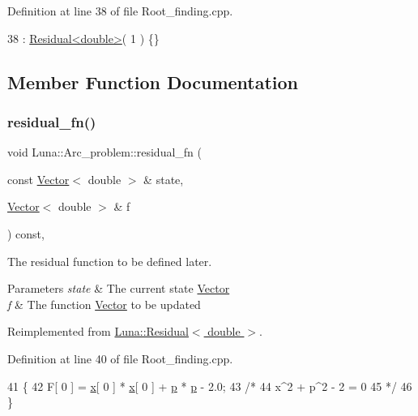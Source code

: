 Definition at line 38 of file Root\+\_\+finding.\+cpp.


\begin{DoxyCode}
38 : \hyperlink{classLuna_1_1Residual}{Residual<double>}( 1 ) \{\}
\end{DoxyCode}


\subsection{Member Function Documentation}
\mbox{\label{classLuna_1_1Arc__problem_aeb5e14b8b06d0ad0f8b42cb280836f97}} 
\subsubsection{\texorpdfstring{residual\+\_\+fn()}{residual\_fn()}}
{\footnotesize\ttfamily void Luna\+::\+Arc\+\_\+problem\+::residual\+\_\+fn (\begin{DoxyParamCaption}\item[{const \hyperlink{classLuna_1_1Vector}{Vector}$<$ double $>$ \&}]{state,  }\item[{\hyperlink{classLuna_1_1Vector}{Vector}$<$ double $>$ \&}]{f }\end{DoxyParamCaption}) const\hspace{0.3cm}{\ttfamily [inline]}, {\ttfamily [virtual]}}



The residual function to be defined later. 


\begin{DoxyParams}{Parameters}
{\em state} & The current state \hyperlink{classLuna_1_1Vector}{Vector} \\
\hline
{\em f} & The function \hyperlink{classLuna_1_1Vector}{Vector} to be updated \\
\hline
\end{DoxyParams}


Reimplemented from \hyperlink{classLuna_1_1Residual_ae1b1ebe3314c788b176bcac7b328de5c}{Luna\+::\+Residual$<$ double $>$}.



Definition at line 40 of file Root\+\_\+finding.\+cpp.


\begin{DoxyCode}
41       \{
42         F[ 0 ] = \hyperlink{namespaceHeat__plot_aa88370c16b85b784ccbde3ed88bc1991}{x}[ 0 ] * \hyperlink{namespaceHeat__plot_aa88370c16b85b784ccbde3ed88bc1991}{x}[ 0 ] + \hyperlink{classLuna_1_1Arc__problem_ab747ff77d23c83ebf8e0e8ab58e9c432}{p} * \hyperlink{classLuna_1_1Arc__problem_ab747ff77d23c83ebf8e0e8ab58e9c432}{p} - 2.0;
43         \textcolor{comment}{/*}
44 \textcolor{comment}{          x^2 + p^2 - 2 = 0}
45 \textcolor{comment}{        */}
46       \}
\end{DoxyCode}


